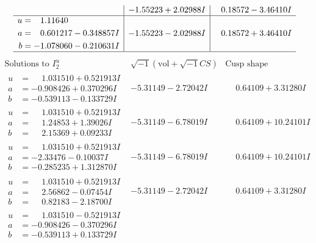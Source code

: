\documentclass[1p]{elsarticle_modified}
\theoremstyle{definition}
\newcommand{\I}{\sqrt{-1}}
\begin{document}
$$\begin{array}{c|c|c}
 & -1.55223 + 2.02988 I & \phantom{-}0.18572 - 3.46410 I \\ \hline\begin{aligned}
u &= \phantom{-}1.11640\phantom{ +0.000000I} \\
a &= \phantom{-}0.601217 - 0.348857 I \\
b &= -1.078060 - 0.210631 I\end{aligned}
 & -1.55223 - 2.02988 I & \phantom{-}0.18572 + 3.46410 I\\
 \hline 
 \end{array}$$\newpage$$\begin{array}{c|c|c}  
\text{Solutions to }I^u_{2}& \I (\text{vol} + \sqrt{-1}CS) & \text{Cusp shape}\\
 \hline 
\begin{aligned}
u &= \phantom{-}1.031510 + 0.521913 I \\
a &= -0.908426 + 0.370296 I \\
b &= -0.539113 - 0.133729 I\end{aligned}
 & -5.31149 - 2.72042 I & \phantom{-}0.64109 + 3.31280 I \\ \hline\begin{aligned}
u &= \phantom{-}1.031510 + 0.521913 I \\
a &= \phantom{-}1.24853 + 1.39026 I \\
b &= \phantom{-}2.15369 + 0.09233 I\end{aligned}
 & -5.31149 - 6.78019 I & \phantom{-}0.64109 + 10.24101 I \\ \hline\begin{aligned}
u &= \phantom{-}1.031510 + 0.521913 I \\
a &= -2.33476 - 0.10037 I \\
b &= -0.285235 + 1.312870 I\end{aligned}
 & -5.31149 - 6.78019 I & \phantom{-}0.64109 + 10.24101 I \\ \hline\begin{aligned}
u &= \phantom{-}1.031510 + 0.521913 I \\
a &= \phantom{-}2.56862 - 0.07454 I \\
b &= \phantom{-}0.82183 - 2.18700 I\end{aligned}
 & -5.31149 - 2.72042 I & \phantom{-}0.64109 + 3.31280 I \\ \hline\begin{aligned}
u &= \phantom{-}1.031510 - 0.521913 I \\
a &= -0.908426 - 0.370296 I \\
b &= -0.539113 + 0.133729 I\end{aligned}

\end{array}$$
\end{document}
